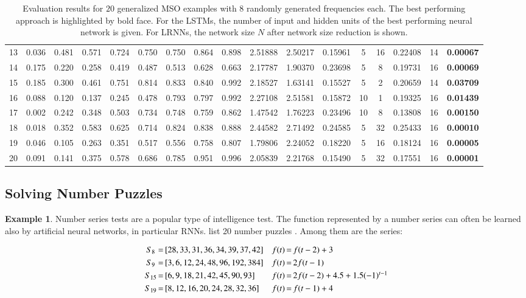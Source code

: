 \documentclass[preprint,12pt,times,authoryear]{elsarticle}%
\theoremstyle{definition}
\newtheorem{exmp}{Example}
\begin{document}
\begin{table}
\begin{tabular}{c*{8}{p{8mm}}cccc@{\,+\,}cccc}
	13 & 0.036 & 0.481 & 0.571 & 0.724 & 0.750 & 0.750 & 0.864 & 0.898 & 2.51888 & 2.50217 & 0.15961 & 5 & 16 & 0.22408 & 14 & \textbf{0.00067}\\
	14 & 0.175 & 0.220 & 0.258 & 0.419 & 0.487 & 0.513 & 0.628 & 0.663 & 2.17787 & 1.90370 & 0.23698 & 5 & 8 & 0.19731 & 16 & \textbf{0.00069}\\
	15 & 0.185 & 0.300 & 0.461 & 0.751 & 0.814 & 0.833 & 0.840 & 0.992 & 2.18527 & 1.63141 & 0.15527 & 5 & 2 & 0.20659 & 14 & \textbf{0.03709}\\
	16 & 0.088 & 0.120 & 0.137 & 0.245 & 0.478 & 0.793 & 0.797 & 0.992 & 2.27108 & 2.51581 & 0.15872 & 10 & 1 & 0.19325 & 16 & \textbf{0.01439}\\
	17 & 0.002 & 0.242 & 0.348 & 0.503 & 0.734 & 0.748 & 0.759 & 0.862 & 1.47542 & 1.76223 & 0.23496 & 10 & 8 & 0.13808 & 16 & \textbf{0.00150}\\
	18 & 0.018 & 0.352 & 0.583 & 0.625 & 0.714 & 0.824 & 0.838 & 0.888 & 2.44582 & 2.71492 & 0.24585 & 5 & 32 & 0.25433 & 16 & \textbf{0.00010}\\
	19 & 0.046 & 0.105 & 0.263 & 0.351 & 0.517 & 0.556 & 0.758 & 0.807 & 1.79806 & 2.24052 & 0.18220 & 5 & 16 & 0.18124 & 16 & \textbf{0.00005}\\
	20 & 0.091 & 0.141 & 0.375 & 0.578 & 0.686 & 0.785 & 0.951 & 0.996 & 2.05839 & 2.21768 & 0.15490 & 5 & 32 & 0.17551 & 16 & \textbf{0.00001}\\
	\bottomrule
  \end{tabular}
\caption{Evaluation results for $20$ generalized MSO examples with $8$ randomly
generated frequencies each. The best performing approach is highlighted by bold
face. For the LSTMs, the number of input and hidden units of the best performing
neural network is given. For LRNNs, the network size $N$ after network size
reduction is shown.}
\label{sideways}
\end{table}

\subsection{Solving Number Puzzles}

\begin{exmp}
Number series tests are a popular type of intelligence test. The function
represented by a number series can often be learned also by artificial neural
networks, in particular RNNs. \citet{GW13} list 20 number puzzles \citep[cf.][]{RK11}.
Among them are the series:

\[ \begin{array}{c@{\,=\,}lc@{\,=\,}l}
	S_8 & [28,33,31,36,34,39,37,42] & f(t) & f(t-2) + 3\\[3pt]
	S_9 & [3,6,12,24,48,96,192,384] & f(t) & 2 f(t-1)\\[3pt]
	S_{15} & [6,9,18,21,42,45,90,93] & f(t) & 2 f(t-2) + 4.5 + 1.5 (-1)^{t-1}\\[3pt]
	S_{19} & [8,12,16,20,24,28,32,36] & f(t) & f(t-1) + 4
\end{array} \]
\end{exmp}
\end{document}
